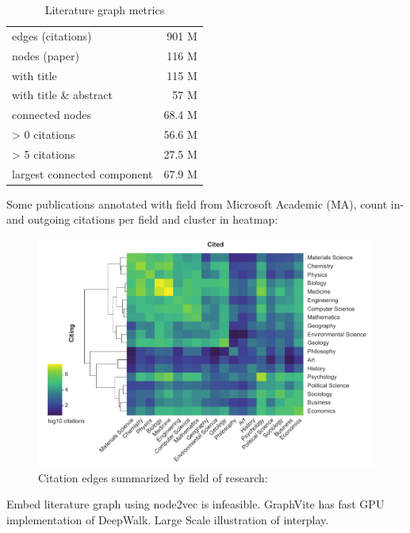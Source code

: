 \begin{table}[ht]
	\centering
	\caption[Literature Graph Metrics]{Literature graph metrics}
	\label{tab:state_of_art:graph}
	\begin{tabular}{l|r}
		\hline
		edges (citations)           & 901 M 	\\
		nodes (paper)               & 116 M 	\\ \hline
		with title					& 115 M		\\
		with title \& abstract		&  57 M		\\ \hline
		connected nodes             &  68.4 M 	\\
		> 0 citations				&  56.6 M	\\
		> 5 citations				&  27.5 M	\\
		largest connected component &  67.9 M 	\\ \hline
	\end{tabular}
\end{table}

Some publications annotated with field from Microsoft Academic (MA), count in- and outgoing citations per field and cluster in heatmap:

\begin{figure}[h]
	\centering
	\includegraphics[width=1.0\textwidth]{figures/state_of_art/field_interactions.pdf}
	\captionsetup{format=plain}
	\caption[Scientific field interactions]{Citation edges summarized by field of research:}
	\label{fig:state_of_art:field_interactions}
\end{figure}

Embed literature graph using node2vec is infeasible. GraphVite has fast GPU implementation of DeepWalk.
Large Scale illustration of interplay.

